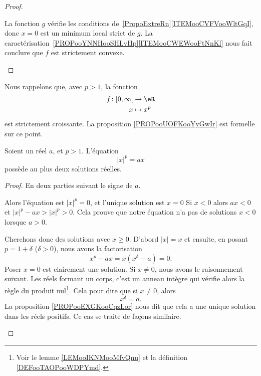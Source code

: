 \begin{proof}
\begin{subproof}
		\spitem[\ref{ITEMooDGISooPlRLOd}]

		La fonction \( g\) vérifie les conditions de~\ref{PropoExtreRn}\ref{ITEMooCVFVooWltGqI}, donc \( x=0\) est un minimum local strict de \( g\). La caractérisation~\ref{PROPooYNNHooSHLvHp}\ref{ITEMooCWEWooFtNnKl} nous fait conclure que \( f\) est strictement convexe.

	\end{subproof}
\end{proof}

\begin{normaltext}
	Nous rappelons que, avec \( p>1\), la fonction
	\begin{equation}
		\begin{aligned}
			f\colon \mathopen[ 0 , \infty \mathclose[ & \to \eR     \\
			x                                         & \mapsto x^p
		\end{aligned}
	\end{equation}
	est strictement croissante. La proposition \ref{PROPooUOFKooYyGwIr} est formelle sur ce point.
\end{normaltext}

\begin{lemma}
	Soient un réel \( a\), et \( p>1\). L'équation
	\begin{equation}
		| x |^p=ax
	\end{equation}
	possède au plus deux solutions réelles.
\end{lemma}

\begin{proof}
	En deux parties suivant le signe de \( a\).
	\begin{subproof}
		\spitem[Si \( a=0\)]
		Alors l'équation est \( | x |^p=0\), et l'unique solution est \( x=0\)
		\spitem[Si \( a>0\)]
		Si \( x<0\) alors \( ax<0\) et \( | x |^p-ax>| x |^p>0\). Cela prouve que notre équation n'a pas de solutions \( x<0\) lorsque \( a>0\).

		Cherchons donc des solutions avec \( x\geq 0\). D'abord \( | x |=x\) et ensuite, en posant \( p=1+\delta\) (\( \delta>0\)), nous avons la factorisation
		\begin{equation}
			x^p-ax=x(x^{\delta}-a)=0.
		\end{equation}
		Poser \( x=0\) est clairement une solution. Si \( x\neq 0\), nous avons le raisonnement suivant. Les réels formant un corps, c'est un anneau intègre qui vérifie alors la règle du produit nul\footnote{Voir le lemme \ref{LEMooIKNMooMfvQnu} et la définition \ref{DEFooTAOPooWDPYmd}.}. Cela pour dire que si \( x\neq 0\), alors
		\begin{equation}
			x^{\delta}=a.
		\end{equation}
		La proposition \ref{PROPooEXGKooCqzLor} nous dit que cela a une unique solution dans les réels positifs.
		\spitem[Si \( a<0\)] Ce cas se traite de façons similaire.
	\end{subproof}
\end{proof}

